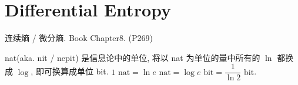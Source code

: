 \chapter{Differential Entropy}

连续熵 / 微分熵. \qquad Book Chapter8. (P269)

nat(aka. nit / nepit) 是信息论中的单位, 将以 nat 为单位的量中所有的 $\ln$ 都换成 $\log$, 即可换算成单位 bit. $1 \text{ nat} = \ln e \text{ nat} = \log e \text{ bit} = \dfrac{1}{\ln 2} \text{ bit}$.



